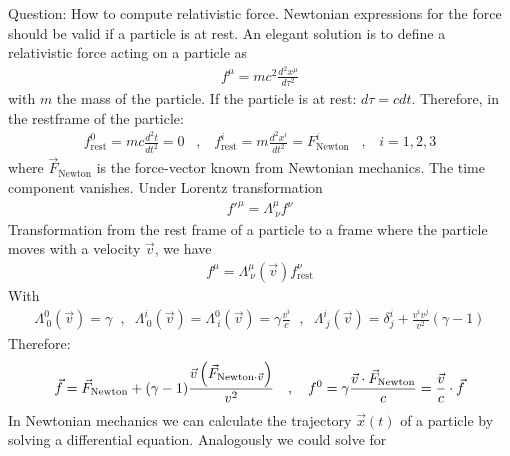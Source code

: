 Question: How to compute relativistic force. Newtonian expressions for the
force should be valid if a particle is at rest. An elegant solution is to
define a relativistic force acting on a particle as
\begin{align*}
    f^\mu = m c^2 \frac{d^2 x^\mu}{d \tau^2}
\end{align*}
with $m$ the mass of the particle. If the particle is at rest: $d \tau = c dt$.
Therefore, in the restframe of the particle:
\begin{align*}
    f_{\text{rest}}^0 = m c \frac{d^2 t}{d t^2} = 0
    \hspace{10pt} , \hspace{10pt}
    f_{\text{rest}}^i = m \frac{d^2 x^i}{d t^2} = F_{\text{Newton}}^i
    \hspace{10pt} , \hspace{10pt} i = 1,2,3
\end{align*}
where $\vec{F}_{\text{Newton}}$ is the force-vector known from Newtonian
mechanics. The time component vanishes. Under Lorentz transformation
\begin{align*}
    f'^\mu = \Lambda_{\ \nu}^\mu f^\nu
\end{align*}
Transformation from the rest frame of a particle to a frame where the particle
moves with a velocity $\vec{v}$, we have
\begin{align*}
    f^\mu = \Lambda_{\ \nu}^\mu (\vec{v}) f_{\text{rest}}^\nu
\end{align*}
With
\begin{align*}
    \Lambda_{\ 0}^0 (\vec{v}) = \gamma
    \hspace{7pt} , \hspace{7pt}
    \Lambda_{\ 0}^i (\vec{v}) = \Lambda_{\ i}^0 (\vec{v}) = \gamma \frac{v^i}{c}
    \hspace{7pt} , \hspace{7pt}
    \Lambda_{\ j}^i (\vec{v}) = \delta_j^i + \frac{v^i v^j}{v^2} (\gamma - 1)
\end{align*}
Therefore:
\begin{align*}
    \vec{f} = \vec{F}_{\text{Newton}} + (\gamma - 1) \frac{\vec{v} \left( \vec{F}_{\text{Newton} \cdot \vec{v}} \right)}{v^2}
    \hspace{10pt} , \hspace{10pt}
    f^0 = \gamma \frac{\vec{v} \cdot \vec{F}_{\text{Newton}}}{c}
    = \frac{\vec{v}}{c} \cdot \vec{f}
\end{align*}
In Newtonian mechanics we can calculate the trajectory $\vec{x}(t)$ of a
particle by solving a differential equation. Analogously we could solve for
